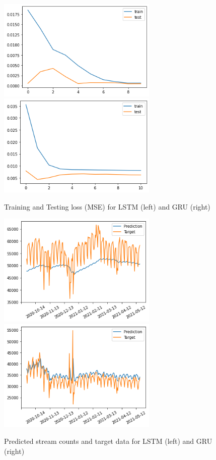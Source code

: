 \documentclass[11pt]{article}
\begin{document}
\begin{figure}[h]
    \centering 
    \includegraphics[width=3in]{figs/lstm_loss.png}
    \includegraphics[width=3in]{figs/gru_loss.png}
    \caption{Training and Testing loss (MSE) for LSTM (left) and GRU (right)}
\end{figure}

\begin{figure}[H]
    \centering
    \includegraphics[width=3in ]{figs/lstm_predicted}
    \includegraphics[width=3in]{figs/gru_predicted}
    \caption{Predicted stream counts and target data for LSTM (left) and GRU (right)}
\end{figure}
\end{document}
